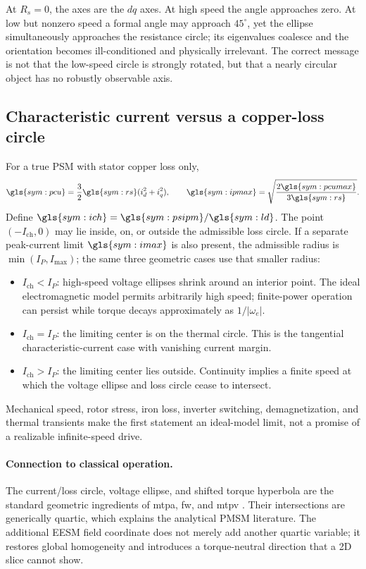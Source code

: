 At \(R_s=0\), the axes are the \(dq\) axes. At high speed the angle approaches
zero. At low but nonzero speed a formal angle may approach \(45^\circ\), yet
the ellipse simultaneously approaches the resistance circle; its eigenvalues
coalesce and the orientation becomes ill-conditioned and physically
irrelevant. The correct message is not that the low-speed circle is strongly
rotated, but that a nearly circular object has no robustly observable axis.



\subsection{Characteristic current versus a copper-loss circle}

For a true PSM with stator copper loss only,
\begin{equation}
 \gls{sym:pcu}=\frac32\gls{sym:rs}(i_d^2+i_q^2),\qquad
 \gls{sym:ipmax}=\sqrt{\frac{2\gls{sym:pcumax}}{3\gls{sym:rs}}}.
 \label{eq:psm-loss-circle}
\end{equation}
Define \(\gls{sym:ich}=\gls{sym:psipm}/\gls{sym:ld}\). The point
\((-I_{\mathrm{ch}},0)\) may lie inside, on, or outside the admissible loss
circle. If a separate peak-current limit \(\gls{sym:imax}\) is also present,
the admissible radius is \(\min(I_P,I_{\max})\); the same three geometric
cases use that smaller radius:
\begin{itemize}
 \item \(I_{\mathrm{ch}}<I_P\): high-speed voltage ellipses shrink around an
       interior point. The ideal electromagnetic model permits arbitrarily
       high speed; finite-power operation can persist while torque decays
       approximately as \(1/|\omega_e|\).
 \item \(I_{\mathrm{ch}}=I_P\): the limiting center is on the thermal circle.
       This is the tangential characteristic-current case with vanishing
       current margin.
 \item \(I_{\mathrm{ch}}>I_P\): the limiting center lies outside. Continuity
       implies a finite speed at which the voltage ellipse and loss circle
       cease to intersect.
\end{itemize}
Mechanical speed, rotor stress, iron loss, inverter switching, demagnetization,
and thermal transients make the first statement an ideal-model limit, not a
promise of a realizable infinite-speed drive.



\paragraph{Connection to classical operation.}
The current/loss circle, voltage ellipse, and shifted torque hyperbola are the
standard geometric ingredients of \gls{mtpa}, \gls{fw}, and \gls{mtpv}
\cite{morimoto1990,kim1997}. Their intersections are generically quartic,
which explains the analytical PMSM literature. The additional EESM field
coordinate does not merely add another quartic variable; it restores global
homogeneity and introduces a torque-neutral direction that a 2D slice cannot
show.
